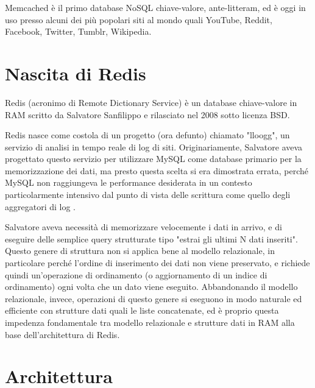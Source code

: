 Memcached è il primo database NoSQL chiave-valore, ante-litteram, ed è oggi in uso presso alcuni
dei più popolari siti al mondo quali YouTube, Reddit, Facebook, Twitter, Tumblr, Wikipedia.


\section{Nascita di Redis}

Redis (acronimo di Remote Dictionary Service) è un database chiave-valore in RAM scritto
da Salvatore Sanfilippo e rilasciato nel 2008 sotto licenza BSD.

Redis nasce come costola di un progetto (ora defunto) chiamato "lloogg", un servizio di
analisi in tempo reale di log di siti. Originariamente, Salvatore aveva progettato
questo servizio per utilizzare MySQL come database primario per la memorizzazione dei
dati, ma presto questa scelta si era dimostrata errata, perché MySQL non raggiungeva le
performance desiderata in un contesto particolarmente intensivo dal punto di vista delle
scrittura come quello degli aggregatori di log \cite{nascita}.

Salvatore aveva necessità di memorizzare velocemente i dati in arrivo, e di eseguire
delle semplice query strutturate tipo "estrai gli ultimi N dati inseriti". Questo genere
di struttura non si applica bene al modello relazionale, in particolare perché l'ordine
di inserimento dei dati non viene preservato, e richiede quindi un'operazione di ordinamento
(o aggiornamento di un indice di ordinamento) ogni volta che un dato viene eseguito.
Abbandonando il modello relazionale, invece, operazioni di questo genere si eseguono
in modo naturale ed efficiente con strutture dati quali le liste concatenate, ed è
proprio questa impedenza fondamentale tra modello relazionale e strutture dati in RAM
alla base dell'architettura di Redis.

\section{Architettura}




